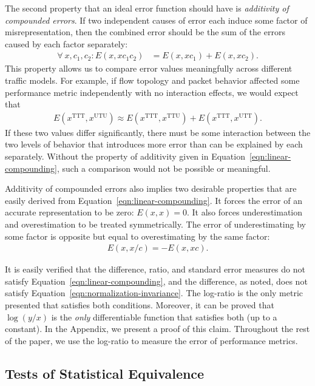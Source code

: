 \documentclass[conference]{IEEEtran}
\newcommand{\TTT}{\text{TTT}}
\newcommand{\TTU}{\text{TTU}}
\newcommand{\UTU}{\text{UTU}}
\newcommand{\UTT}{\text{UTT}}
\begin{document}
The second property that an ideal error function should have is  \textit{additivity of compounded errors}. If two independent causes of error each induce some factor of misrepresentation, then the combined error should be the sum of the errors caused by each factor separately:
\begin{align}
\label{eqn:linear-compounding}
\forall\: x,c_1,c_2:
	E(x,x c_1 c_2) &= E(x,x c_1) + E(x,x c_2).
\end{align}
This property allows us to compare error values meaningfully across different traffic models. For example, if flow topology and packet behavior affected some performance metric independently with no interaction effects, we would expect that
\begin{align}
E(x^\TTT,x^\UTU) \approx E(x^\TTT,x^\TTU) + E(x^\TTT,x^\UTT).
\end{align}
If these two values differ significantly, there must be some interaction between the two levels of behavior that introduces more error than can be explained by each separately. Without the property of additivity given in Equation~\ref{eqn:linear-compounding}, such a comparison would not be possible or meaningful.

Additivity of compounded errors also implies two desirable properties that are easily derived from Equation~\ref{eqn:linear-compounding}. It forces the error of an accurate representation to be zero: $E(x,x) = 0$. It also forces underestimation and overestimation to be treated symmetrically. The error of underestimating by some factor is opposite but equal to overestimating by the same factor:
\begin{align}
E(x,x/c) = - E(x,xc).
\end{align}

It is easily verified that the difference, ratio, and standard error measures do not satisfy Equation~\ref{eqn:linear-compounding}, and the difference, as noted, does not satisfy Equation~\ref{eqn:normalization-invariance}. The log-ratio is the only metric presented that satisfies both conditions. Moreover, it can be proved that $\log(y/x)$ is the \textit{only} differentiable function that satisfies both (up to a constant). In the Appendix, we present a proof of this claim. Throughout the rest of the paper, we use the log-ratio to measure the error of performance metrics.

\subsection{Tests of Statistical Equivalence}\label{sec:statistical-equivalence}
\end{document}
